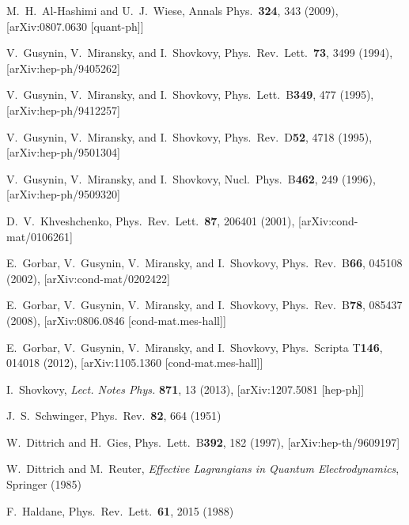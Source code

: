 \documentclass[aps,prd,twocolumn,showpacs,superscriptaddress,groupedaddress]{revtex4}  %
\begin{document}
\begin{thebibliography}{99}
M.~H.~Al-Hashimi and U.~J.~Wiese, Annals Phys.\ {\bf 324}, 343 (2009), [arXiv:0807.0630 [quant-ph]]

V.~Gusynin, V.~Miransky, and I.~Shovkovy, Phys.\ Rev.\ Lett.\ {\bf 73}, 3499 (1994), [arXiv:hep-ph/9405262]

V.~Gusynin, V.~Miransky, and I.~Shovkovy, Phys.\ Lett.\ B{\bf 349}, 477 (1995), [arXiv:hep-ph/9412257]

V.~Gusynin, V.~Miransky, and I.~Shovkovy, Phys.\ Rev.\ D{\bf 52}, 4718 (1995), [arXiv:hep-ph/9501304]

V.~Gusynin, V.~Miransky, and I.~Shovkovy, Nucl.\ Phys.\ B{\bf 462}, 249 (1996), [arXiv:hep-ph/9509320]

D.~V.~Khveshchenko, Phys.\ Rev.\ Lett.\ {\bf 87}, 206401 (2001), [arXiv:cond-mat/0106261]

E.~Gorbar, V.~Gusynin, V.~Miransky, and I.~Shovkovy, Phys.\ Rev.\ B{\bf 66}, 045108 (2002), [arXiv:cond-mat/0202422]

E.~Gorbar, V.~Gusynin, V.~Miransky, and I.~Shovkovy, Phys.\ Rev.\ B{\bf 78}, 085437 (2008), [arXiv:0806.0846 [cond-mat.mes-hall]]

E.~Gorbar, V.~Gusynin, V.~Miransky, and I.~Shovkovy, Phys.\ Scripta T{\bf 146}, 014018 (2012), [arXiv:1105.1360 [cond-mat.mes-hall]]

I.~Shovkovy, {\it Lect. Notes Phys.} {\bf 871}, 13 (2013), [arXiv:1207.5081 [hep-ph]]

J.~S.~Schwinger, Phys.\ Rev.\ {\bf 82}, 664 (1951)

W.~Dittrich and H.~Gies, Phys.\ Lett.\ B{\bf 392}, 182 (1997), [arXiv:hep-th/9609197]

W.~Dittrich and M.~Reuter, {\it Effective Lagrangians in Quantum Electrodynamics}, Springer (1985)




F.~Haldane, Phys.\ Rev.\ Lett.\ {\bf  61}, 2015 (1988)


\end{thebibliography}
\end{document}
